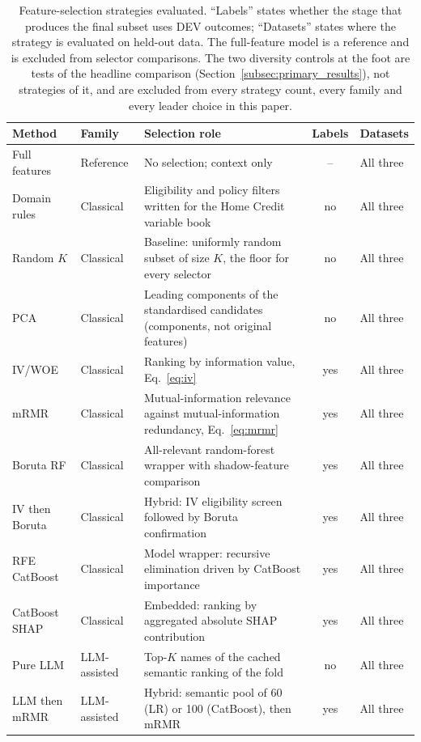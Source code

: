 \documentclass[final,5p,twocolumn]{elsarticle}
\newcommand{\Kfeat}{K}
\begin{document}
\begin{table}[htbp]
\centering
\footnotesize
\begin{threeparttable}
\caption{Feature-selection strategies evaluated. ``Labels'' states whether the stage that produces the final subset uses DEV outcomes; ``Datasets'' states where the strategy is evaluated on held-out data. The full-feature model is a reference and is excluded from selector comparisons. The two diversity controls at the foot are tests of the headline comparison (Section~\ref{subsec:primary_results}), not strategies of it, and are excluded from every strategy count, every family and every leader choice in this paper.}
\label{tab:methods}
\begin{tabular}{@{}llL{46mm}cl@{}}
\toprule
Method & Family & Selection role & Labels & Datasets \\
\midrule
Full features & Reference & No selection; context only & -- & All three \\
Domain rules & Classical & Eligibility and policy filters written for the Home Credit variable book & no & All three \\
Random $\Kfeat$ & Classical & Baseline: uniformly random subset of size $\Kfeat$, the floor for every selector & no & All three \\
PCA & Classical & Leading components of the standardised candidates (components, not original features) & no & All three \\
IV/WOE & Classical & Ranking by information value, Eq.~\eqref{eq:iv} & yes & All three \\
mRMR & Classical & Mutual-information relevance against mutual-information redundancy, Eq.~\eqref{eq:mrmr} & yes & All three \\
Boruta RF & Classical & All-relevant random-forest wrapper with shadow-feature comparison & yes & All three \\
IV then Boruta & Classical & Hybrid: IV eligibility screen followed by Boruta confirmation & yes & All three \\
RFE CatBoost & Classical & Model wrapper: recursive elimination driven by CatBoost importance & yes & All three \\
CatBoost SHAP & Classical & Embedded: ranking by aggregated absolute SHAP contribution & yes & All three \\
Pure LLM & LLM-assisted & Top-$\Kfeat$ names of the cached semantic ranking of the fold & no & All three \\
LLM then mRMR & LLM-assisted & Hybrid: semantic pool of 60 (LR) or 100 (CatBoost), then mRMR & yes & All three \\

\end{tabular}
\end{threeparttable}
\end{table}
\end{document}
